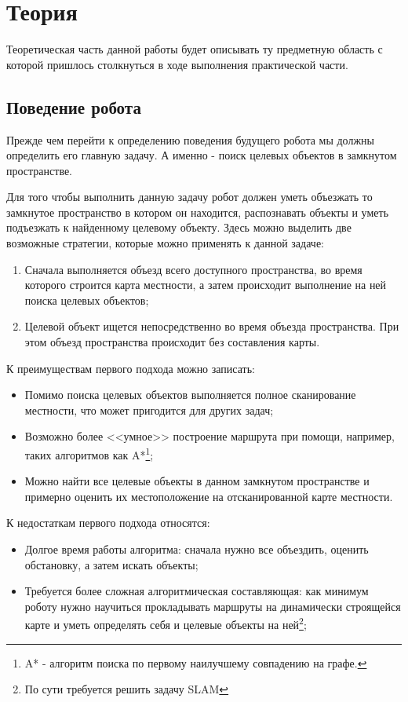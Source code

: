 \chapter{Теория}\label{ch:ch1}

Теоретическая часть данной работы будет описывать ту предметную область с которой пришлось столкнуться в ходе выполнения практической части.

\section{Поведение робота} \label{sec:robot-behavior}

Прежде чем перейти к определению поведения будущего робота мы должны определить его главную задачу. А именно - поиск целевых объектов в замкнутом пространстве.

Для того чтобы выполнить данную задачу робот должен уметь объезжать то замкнутое пространство в котором он находится, распознавать объекты и уметь подъезжать к найденному целевому объекту. Здесь можно выделить две возможные стратегии, которые можно применять к данной задаче:

\begin{enumerate}
\item Сначала выполняется объезд всего доступного пространства, во время которого строится карта местности, а затем происходит выполнение на ней поиска целевых объектов;
\item Целевой объект ищется непосредственно во время объезда пространства. При этом объезд пространства происходит без составления карты.
\end{enumerate} 

К преимуществам первого подхода можно записать:
\begin{itemize}
\item Помимо поиска целевых объектов выполняется полное сканирование местности, что может пригодится для других задач;
\item Возможно более <<умное>> построение маршрута при помощи, например, таких алгоритмов как A*\footnote{A* - алгоритм поиска по первому наилучшему совпадению на графе\cite[с. 218]{лорьер}.};
\item Можно найти все целевые объекты в данном замкнутом пространстве и примерно оценить их местоположение на отсканированной карте местности.
\end{itemize}

К недостаткам первого подхода относятся:
\begin{itemize}
\item Долгое время работы алгоритма: сначала нужно все объездить, оценить обстановку, а затем искать объекты;
\item Требуется более сложная алгоритмическая составляющая: как минимум роботу нужно научиться прокладывать маршруты на динамически строящейся карте и уметь определять себя и целевые объекты на ней\footnote{По сути требуется решить задачу SLAM};
\end{itemize}

